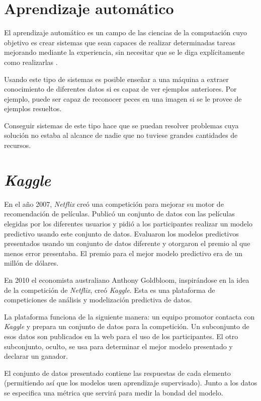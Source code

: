 \section{Aprendizaje automático}

El aprendizaje automático es un campo de las ciencias de la computación
cuyo objetivo es crear sistemas que sean capaces de realizar determinadas
tareas mejorando mediante la experiencia, sin necesitar que se le diga
explícitamente como realizarlas \parencite{mitchell}.

Usando este tipo de sistemas es posible enseñar a una máquina a extraer
conocimiento de diferentes datos si es capaz de ver ejemplos anteriores.
Por ejemplo, puede ser capaz de reconocer peces en una imagen si se le 
provee de ejemplos resueltos.

Conseguir sistemas de este tipo hace que se puedan resolver problemas
cuya solución no estaba al alcance de nadie que no tuviese grandes
cantidades de recursos.

\section{\textit{Kaggle}}

En el año 2007, \textit{Netflix} creó una competición para mejorar su motor de
recomendación de películas. Publicó un conjunto de datos con las películas
elegidas por los diferentes usuarios y pidió a los participantes realizar un
modelo predictivo usando este conjunto de datos. Evaluaron los modelos
predictivos presentados usando un conjunto de datos diferente y otorgaron el
premio al que menos error presentaba. El premio para el mejor modelo predictivo
era de un millón de dólares.

En 2010 el economista australiano Anthony Goldbloom, inspirándose en la idea de
la competición de \textit{Netflix}, creó \textit{Kaggle}. Esta es una
plataforma de competiciones de análisis y modelización predictiva de datos.

La plataforma funciona de la siguiente manera: un equipo promotor
contacta con \textit{Kaggle} y prepara un conjunto de datos para la competición.
Un subconjunto de esos datos son publicados en la web para el uso de los
participantes. El otro subconjunto, oculto, se usa para determinar el mejor
modelo presentado y declarar un ganador.

El conjunto de datos presentado contiene las respuestas de cada elemento
(permitiendo así que los modelos usen aprendizaje supervisado). Junto a los
datos se especifica una métrica que servirá para medir la bondad del modelo.

